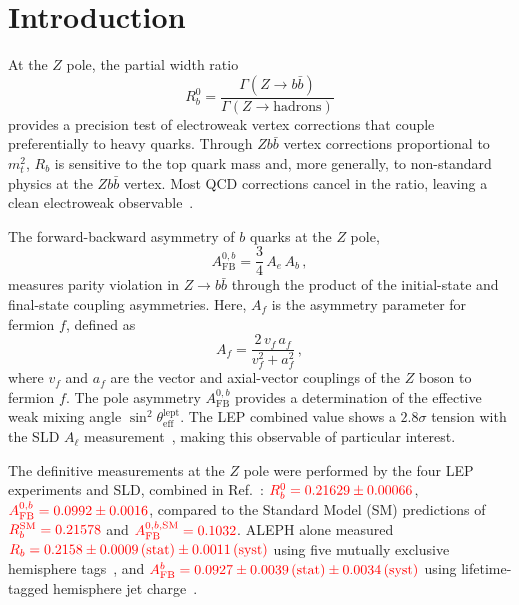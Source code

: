 \documentclass[11pt,a4paper]{article}
\newcommand{\external}[1]{\textcolor{red}{#1}}
\begin{document}
\clearpage

\section{Introduction}
\label{sec:intro}

At the $Z$ pole, the partial width ratio
\begin{equation}
R_b^0 = \frac{\Gamma(Z \to b\bar{b})}{\Gamma(Z \to \text{hadrons})}
\label{eq:Rb_def}
\end{equation}
provides a precision test of electroweak vertex corrections that
couple preferentially to heavy quarks.
Through $Zb\bar{b}$ vertex corrections proportional to $m_t^2$,
$R_b$ is sensitive to the top quark mass and, more generally, to
non-standard physics at the $Zb\bar{b}$ vertex.
Most QCD corrections cancel in the ratio, leaving a clean
electroweak observable~\cite{LEP:EWWG:2005}.

The forward-backward asymmetry of $b$ quarks at the $Z$ pole,
\begin{equation}
A_\text{FB}^{0,b} = \frac{3}{4}\, A_e \, A_b\,,
\label{eq:AFBb_def}
\end{equation}
measures parity violation in $Z \to b\bar{b}$ through the product
of the initial-state and final-state coupling asymmetries.
Here, $A_f$ is the asymmetry parameter for fermion $f$, defined as
\begin{equation}
A_f = \frac{2\, v_f\, a_f}{v_f^2 + a_f^2}\,,
\label{eq:Af_def}
\end{equation}
where $v_f$ and $a_f$ are the vector and axial-vector couplings of
the $Z$ boson to fermion $f$.
The pole asymmetry $A_\text{FB}^{0,b}$ provides a determination of
the effective weak mixing angle $\sin^2\theta_\text{eff}^\text{lept}$.
The LEP combined value shows a $2.8\sigma$ tension with the SLD
$A_\ell$ measurement~\cite{LEP:EWWG:2005}, making this observable
of particular interest.

The definitive measurements at the $Z$ pole were performed by the
four LEP experiments and SLD, combined in
Ref.~\cite{LEP:EWWG:2005}:
$\external{R_b^0 = 0.21629 \pm 0.00066}$,
$\external{A_\text{FB}^{0,b} = 0.0992 \pm 0.0016}$,
compared to the Standard Model (SM) predictions of
$\external{R_b^\text{SM} = 0.21578}$ and
$\external{A_\text{FB}^{0,b,\text{SM}} = 0.1032}$.
ALEPH alone measured
$\external{R_b = 0.2158 \pm 0.0009\,\text{(stat)} \pm 0.0011\,\text{(syst)}}$
using five mutually exclusive hemisphere tags~\cite{ALEPH:Rb:1996},
and
$\external{A_\text{FB}^b = 0.0927 \pm 0.0039\,\text{(stat)} \pm 0.0034\,\text{(syst)}}$
using lifetime-tagged hemisphere jet charge~\cite{ALEPH:AFBb}.
\end{document}
